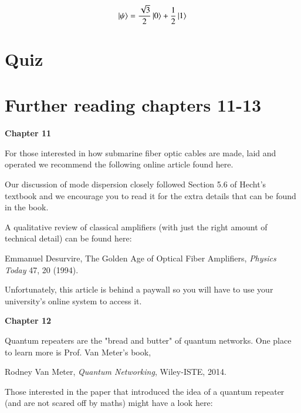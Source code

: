 \newpage
\begin{exercises}
\begin{equation*}
\left| \psi \right\rangle = \frac{\sqrt{3}}{2}\left| 0 \right\rangle + \frac{1}{2}\left| 1 \right\rangle
\end{equation*}


\end{exercises}

\newpage
\section*{Quiz}


\section*{Further reading chapters 11-13}

{\bf Chapter 11}

For those interested in how submarine fiber optic cables are made, laid and operated we recommend the following online article found here.

Our discussion of mode dispersion closely followed Section 5.6 of Hecht’s textbook and we encourage you to read it for the extra details that can be found in the book.

A qualitative review of classical amplifiers (with just the right amount of technical detail) can be found here:

Emmanuel Desurvire, The Golden Age of Optical Fiber Amplifiers, \emph{Physics Today} 47, 20 (1994).

Unfortunately, this article is behind a paywall so you will have to use your university’s online system to access it.

{\bf Chapter 12}

Quantum repeaters are the "bread and butter" of quantum networks. One place to learn more is Prof. Van Meter's book,

Rodney Van Meter, \emph{Quantum Networking}, Wiley-ISTE, 2014.

Those interested in the paper that introduced the idea of a quantum repeater (and are not scared off by maths) might have a look here:

